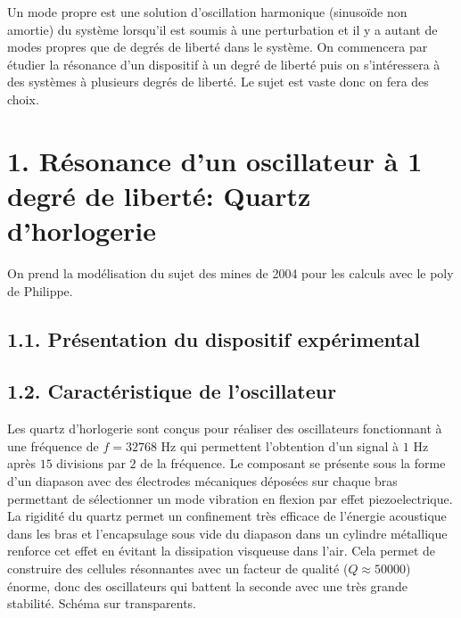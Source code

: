 \documentclass[french, a4paper, 10pt, twocolumn, landscape]{article}
\begin{document}
Un mode propre est une solution d’oscillation harmonique (sinusoïde non amortie) du système lorsqu’il
est soumis à une perturbation et il y a autant de modes propres que de degrés de liberté dans le
système. On commencera par étudier la résonance d'un dispositif à un degré de liberté puis on s'intéressera à des systèmes à plusieurs degrés de liberté. Le sujet est vaste donc on fera des choix.



\section*{1. Résonance d'un oscillateur à 1 degré de liberté: Quartz d'horlogerie}

On prend la modélisation du sujet des mines de 2004 pour les calculs avec le poly de Philippe.

\subsection*{1.1. Présentation du dispositif expérimental}


\subsection*{1.2. Caractéristique de l'oscillateur }


Les quartz d'horlogerie sont conçus pour réaliser des oscillateurs fonctionnant à une fréquence de $f=32768$ Hz qui permettent l'obtention d'un signal à $1$ Hz après $15$ divisions par $2$ de la fréquence. Le composant se présente sous la forme d'un diapason avec des électrodes mécaniques déposées sur chaque bras permettant de sélectionner un mode vibration en flexion par effet piezoelectrique. La rigidité du quartz permet un confinement très efficace de l’énergie acoustique dans les bras et
l’encapsulage sous vide du diapason dans un cylindre métallique renforce cet effet en évitant la
dissipation visqueuse dans l’air. Cela permet de construire des cellules résonnantes avec un facteur
de qualité ($Q\approx 50 000$) énorme, donc des oscillateurs qui battent la seconde avec une très grande stabilité. Schéma sur transparents.
\end{document}
